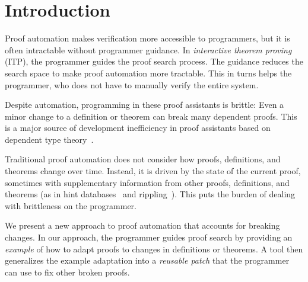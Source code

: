 \section{Introduction}


Proof automation makes verification more accessible to programmers, but it is often intractable
without programmer guidance. In \textit{interactive theorem proving} (ITP), the programmer guides the 
proof search process. The guidance reduces the search space to make proof automation more tractable.
This in turns helps the programmer, who does not have to manually verify the entire system.



Despite automation, programming in these proof assistants is brittle: Even a minor change to a definition or theorem
can break many dependent proofs. This is a major source of development inefficiency in proof assistants
based on dependent type theory~\cite{proof-eng, Aydemir2008, Delaware2013ICFP}.

Traditional proof automation does not consider how proofs, definitions, and theorems change over time.
Instead, it is driven by the state of the current proof, sometimes with supplementary
information from other proofs, definitions, and theorems (as in hint databases~\cite{hints} and rippling~\cite{rippling}).
This puts the burden of dealing with brittleness on the programmer. 

We present a new approach to proof automation that accounts for breaking changes. %
In our approach, the programmer guides proof search 
by providing an \textit{example} of how to adapt proofs to changes in definitions or theorems.
A tool then generalizes the example adaptation into a \textit{reusable patch} that the programmer can use to fix
other broken proofs.

